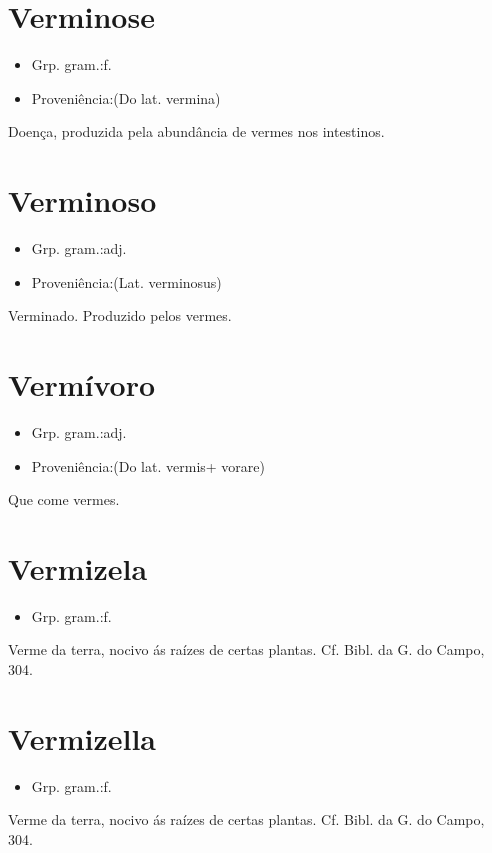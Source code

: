 \documentclass{article}
\begin{document}
\section{Verminose}
\begin{itemize}
\item {Grp. gram.:f.}
\end{itemize}
\begin{itemize}
\item {Proveniência:(Do lat. \textunderscore vermina\textunderscore )}
\end{itemize}
Doença, produzida pela abundância de vermes nos intestinos.
\section{Verminoso}
\begin{itemize}
\item {Grp. gram.:adj.}
\end{itemize}
\begin{itemize}
\item {Proveniência:(Lat. \textunderscore verminosus\textunderscore )}
\end{itemize}
Verminado.
Produzido pelos vermes.
\section{Vermívoro}
\begin{itemize}
\item {Grp. gram.:adj.}
\end{itemize}
\begin{itemize}
\item {Proveniência:(Do lat. \textunderscore vermis\textunderscore  + \textunderscore vorare\textunderscore )}
\end{itemize}
Que come vermes.
\section{Vermizela}
\begin{itemize}
\item {Grp. gram.:f.}
\end{itemize}
Verme da terra, nocivo ás raízes de certas plantas. Cf. \textunderscore Bibl. da G. do Campo\textunderscore , 304.
\section{Vermizella}
\begin{itemize}
\item {Grp. gram.:f.}
\end{itemize}
Verme da terra, nocivo ás raízes de certas plantas. Cf. \textunderscore Bibl. da G. do Campo\textunderscore , 304.
\end{document}
